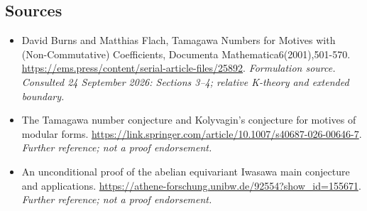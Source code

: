 \documentclass[11pt]{article}
\begin{document}
\subsection{Sources}
\begin{itemize}
\item[S1]David Burns and Matthias Flach, Tamagawa Numbers for Motives with (Non-Commutative) Coefficients, Documenta Mathematica6(2001),501-570.
\url{https://ems.press/content/serial-article-files/25892}.
\textit{Formulation source. Consulted 24 September 2026: Sections 3--4; relative K-theory and extended boundary.}
\item[S2]The Tamagawa number conjecture and Kolyvagin's conjecture for motives of modular forms.
\url{https://link.springer.com/article/10.1007/s40687-026-00646-7}.
\textit{Further reference; not a proof endorsement.}
\item[S3]An unconditional proof of the abelian equivariant Iwasawa main conjecture and applications.
\url{https://athene-forschung.unibw.de/92554?show_id=155671}.
\textit{Further reference; not a proof endorsement.}
\end{itemize}
\end{document}
